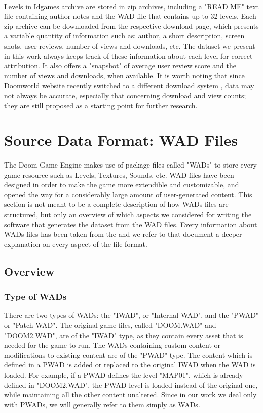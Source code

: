 \paragraph{} Levels in Idgames archive are stored in zip archives, including a "READ ME" text file containing author notes and the \gls{WAD} file that contains up to 32 levels. 
Each zip archive can be downloaded from the respective download page, which presents a variable quantity of information such as: author, a short description, screen shots, user reviews, number of views and downloads, etc.
The dataset we present in this work always keeps track of these information about each level for correct attribution. It also offers a "snapshot" of average user review score and the number of views and downloads, when available. It is worth noting that since Doomworld website recently switched to a different download system \cite{wiki:doomworld}, data may not always be accurate, especially that concerning download and view counts; they are still proposed as a starting point for further research. 
\section{Source Data Format: WAD Files}
\label{sec:WAD} 
\paragraph{} The Doom Game Engine \cite{doomengine} makes use of package files called "\glspl{WAD}" to store every game resource such as Levels, Textures, Sounds, etc. 
\gls{WAD} files have been designed in order to make the game more extendible and customizable, and opened the way for a considerably large amount of user-generated content. This section is not meant to be a complete description of how \glspl{WAD} files are structured, but only an overview of which aspects we considered for writing the software that generates the dataset from the \gls{WAD} files. Every information about \glspl{WAD} files has been taken from the  \cite{doomspecs} and we refer to that document a deeper explanation on every aspect of the file format.
\subsection{Overview}
\subsubsection{Type of WADs}
There are two types of \glspl{WAD}: the "IWAD", or "Internal WAD", and the "PWAD" or "Patch WAD". The original game files, called "DOOM.WAD" and "DOOM2.WAD", are of the "IWAD" type, as they contain every asset that is needed for the game to run. The \glspl{WAD} containing custom content or modifications to existing content are of the "PWAD" type. The content which is defined in a PWAD is added or replaced to the original IWAD when the \gls{WAD} is loaded. For example, if a PWAD defines the level "MAP01", which is already defined in "DOOM2.WAD", the PWAD level is loaded instead of the original one, while maintaining all the other content unaltered.
Since in our work we deal only with PWADs, we will generally refer to them simply as \glspl{WAD}.

